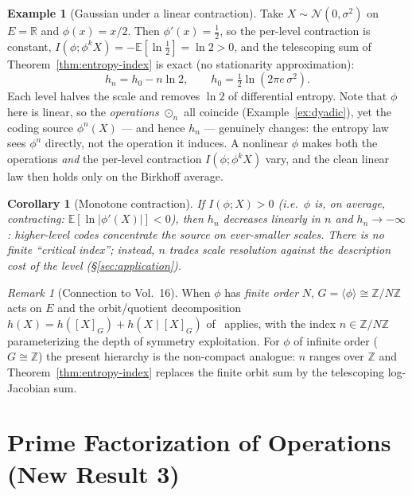 \documentclass[11pt,twocolumn]{article}
\theoremstyle{plain}
\newtheorem{corollary}[theorem]{Corollary}
\theoremstyle{definition}
\newtheorem{example}[theorem]{Example}
\theoremstyle{remark}
\newtheorem{remark}[theorem]{Remark}
\newcommand{\Z}{\mathbb{Z}}
\newcommand{\R}{\mathbb{R}}
\begin{document}
\begin{example}[Gaussian under a linear contraction]\label{ex:gauss-entropy}
Take $X\sim\mathcal N(0,\sigma^2)$ on $E=\R$ and $\phi(x)=x/2$. Then $\phi'(x)=\tfrac12$, so the per-level contraction is constant, $I(\phi;\phi^kX)=-\mathbb E[\ln\tfrac12]=\ln 2>0$, and the telescoping sum of Theorem~\ref{thm:entropy-index} is exact (no stationarity approximation):
\[
h_n=h_0-n\ln 2,\qquad h_0=\tfrac12\ln(2\pi e\,\sigma^2).
\]
Each level halves the scale and removes $\ln 2$ of differential entropy. Note that $\phi$ here is linear, so the \emph{operations} $\odot_n$ all coincide (Example~\ref{ex:dyadic}), yet the coding source $\phi^n(X)$ --- and hence $h_n$ --- genuinely changes: the entropy law sees $\phi^n$ directly, not the operation it induces. A nonlinear $\phi$ makes both the operations \emph{and} the per-level contraction $I(\phi;\phi^kX)$ vary, and the clean linear law then holds only on the Birkhoff average.
\end{example}

\begin{corollary}[Monotone contraction]
If $I(\phi;X) > 0$ (i.e.\ $\phi$ is, on average, contracting: $\mathbb{E}[\ln|\phi'(X)|] < 0$), then $h_n$ decreases linearly in $n$ and $h_n \to -\infty$: higher-level codes concentrate the source on ever-smaller scales. There is no finite ``critical index''; instead, $n$ trades scale resolution against the description cost of the level (\S\ref{sec:application}).
\end{corollary}

\begin{remark}[Connection to Vol.~16]
When $\phi$ has \emph{finite order} $N$, $G = \langle\phi\rangle \cong \Z/N\Z$ acts on $E$ and the orbit/quotient decomposition $h(X) = h([X]_G) + h(X \mid [X]_G)$ of~\cite{nembe2026vol16} applies, with the index $n \in \Z/N\Z$ parameterizing the depth of symmetry exploitation. For $\phi$ of infinite order ($G \cong \Z$) the present hierarchy is the non-compact analogue: $n$ ranges over $\Z$ and Theorem~\ref{thm:entropy-index} replaces the finite orbit sum by the telescoping log-Jacobian sum.
\end{remark}


\section{Prime Factorization of Operations (New Result 3)}
\label{sec:prime}
\end{document}
